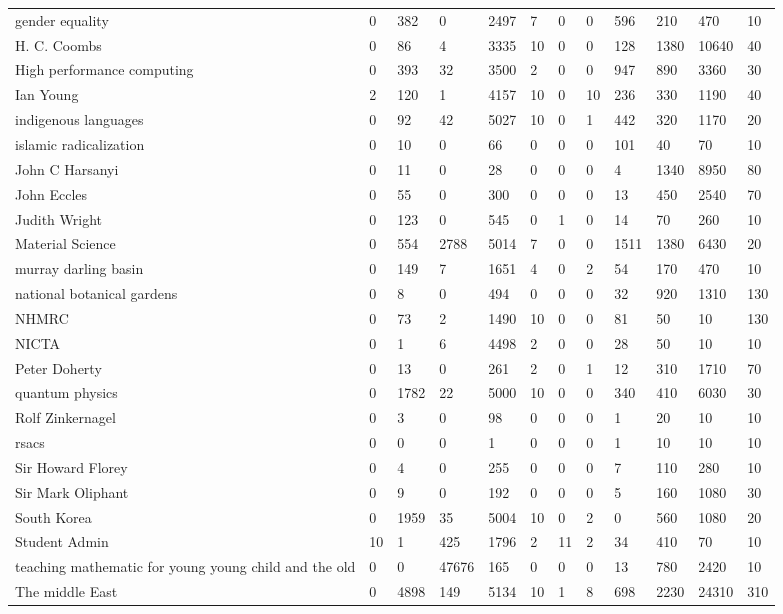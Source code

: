 \documentclass[5pt]{article}
\begin{document}
\begin{table}
\begin{tabular*}{0.5\textwidth}{|p{5cm}|l|l|l|l|l|l|l|l|l|l|l|}
\cline{1-12}
gender equality &0 &382 &0 &2497 &7 &0 &0 &596 &210 &470 &10\\
\cline{1-12}
H. C. Coombs &0 &86 &4 &3335 &10 &0 &0 &128 &1380 &10640 &40\\
\cline{1-12}
High performance computing &0 &393 &32 &3500 &2 &0 &0 &947 &890 &3360 &30\\
\cline{1-12}
Ian Young &2 &120 &1 &4157 &10 &0 &10 &236 &330 &1190 &40\\
\cline{1-12}
indigenous languages &0 &92 &42 &5027 &10 &0 &1 &442 &320 &1170 &20\\
\cline{1-12}
islamic radicalization &0 &10 &0 &66 &0 &0 &0 &101 &40 &70 &10\\
\cline{1-12}
John C Harsanyi &0 &11 &0 &28 &0 &0 &0 &4 &1340 &8950 &80\\
\cline{1-12}
John Eccles &0 &55 &0 &300 &0 &0 &0 &13 &450 &2540 &70\\
\cline{1-12}
Judith Wright &0 &123 &0 &545 &0 &1 &0 &14 &70 &260 &10\\
\cline{1-12}
Material Science &0 &554 &2788 &5014 &7 &0 &0 &1511 &1380 &6430 &20\\
\cline{1-12}
murray darling basin &0 &149 &7 &1651 &4 &0 &2 &54 &170 &470 &10\\
\cline{1-12}
national botanical gardens &0 &8 &0 &494 &0 &0 &0 &32 &920 &1310 &130\\
\cline{1-12}
NHMRC &0 &73 &2 &1490 &10 &0 &0 &81 &50 &10 &130\\
\cline{1-12}
NICTA &0 &1 &6 &4498 &2 &0 &0 &28 &50 &10 &10\\
\cline{1-12}
Peter Doherty &0 &13 &0 &261 &2 &0 &1 &12 &310 &1710 &70\\
\cline{1-12}
quantum physics &0 &1782 &22 &5000 &10 &0 &0 &340 &410 &6030 &30\\
\cline{1-12}
Rolf Zinkernagel &0 &3 &0 &98 &0 &0 &0 &1 &20 &10 &10\\
\cline{1-12}
rsacs &0 &0 &0 &1 &0 &0 &0 &1 &10 &10 &10\\
\cline{1-12}
Sir Howard Florey &0 &4 &0 &255 &0 &0 &0 &7 &110 &280 &10\\
\cline{1-12}
Sir Mark Oliphant &0 &9 &0 &192 &0 &0 &0 &5 &160 &1080 &30\\
\cline{1-12}
South Korea &0 &1959 &35 &5004 &10 &0 &2 &0 &560 &1080 &20\\
\cline{1-12}
Student Admin &10 &1 &425 &1796 &2 &11 &2 &34 &410 &70 &10\\
\cline{1-12}
teaching mathematic for young young child and the old &0 &0 &47676 &165 &0 &0 &0 &13 &780 &2420 &10\\
\cline{1-12}
The middle East &0 &4898 &149 &5134 &10 &1 &8 &698 &2230 &24310 &310\\
\cline{1-12}
\end{tabular*}
\end{table}
\end{document}
